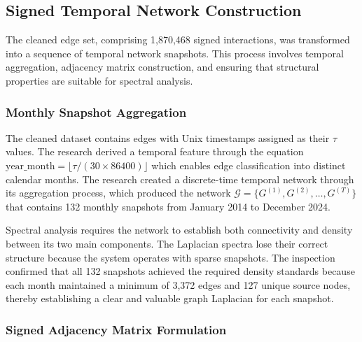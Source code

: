 \documentclass[a4paper,fleqn]{cas-dc}
\begin{document}
\subsection{Signed Temporal Network Construction}
\label{sec:network_construction}

The cleaned edge set, comprising 1,870,468 signed interactions, was transformed into a sequence of temporal network snapshots. This process involves temporal aggregation, adjacency matrix construction, and ensuring that structural properties are suitable for spectral analysis.

\subsubsection{Monthly Snapshot Aggregation}
\label{subsec:monthly_aggregation}

The cleaned dataset contains edges with Unix timestamps assigned as their \( \tau \) values. The research derived a temporal feature through the equation \( \text{year\_month} = \lfloor \tau / (30 \times 86400) \rfloor \) which enables edge classification into distinct calendar months. The research created a discrete-time temporal network through its aggregation process, which produced the network \( \mathcal{G} = \{G^{(1)}, G^{(2)}, \dots, G^{(T)}\} \) that contains 132 monthly snapshots from January 2014 to December 2024.

Spectral analysis requires the network to establish both connectivity and density between its two main components. The Laplacian spectra lose their correct structure because the system operates with sparse snapshots. The inspection confirmed that all 132 snapshots achieved the required density standards because each month maintained a minimum of 3,372 edges and 127 unique source nodes, thereby establishing a clear and valuable graph Laplacian for each snapshot.

\subsubsection{Signed Adjacency Matrix Formulation}
\label{subsec:adjacency_matrix}
\end{document}
